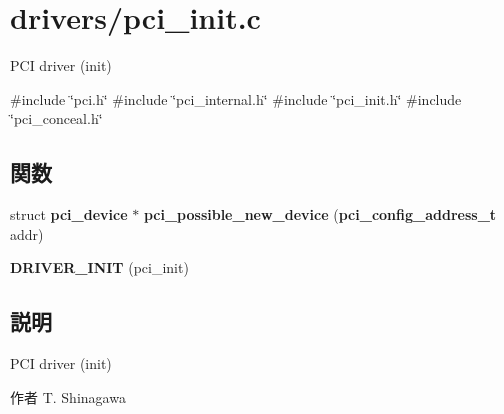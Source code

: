 \section{drivers/pci\-\_\-init.c}
\label{pci__init_8c}


\-P\-C\-I driver (init)  


{\ttfamily \#include \char`\"{}pci.\-h\char`\"{}}\*
{\ttfamily \#include \char`\"{}pci\-\_\-internal.\-h\char`\"{}}\*
{\ttfamily \#include \char`\"{}pci\-\_\-init.\-h\char`\"{}}\*
{\ttfamily \#include \char`\"{}pci\-\_\-conceal.\-h\char`\"{}}\*
\subsection*{関数}
\begin{DoxyCompactItemize}
\item 
struct {\bf pci\-\_\-device} $\ast$ {\bfseries pci\-\_\-possible\-\_\-new\-\_\-device} ({\bf pci\-\_\-config\-\_\-address\-\_\-t} addr)\label{pci__init_8c_a665e70cca9e317fdc65692f722758b89}

\item 
{\bfseries \-D\-R\-I\-V\-E\-R\-\_\-\-I\-N\-I\-T} (pci\-\_\-init)\label{pci__init_8c_adcf8aacfd26e28157747b5aeaf96169e}

\end{DoxyCompactItemize}


\subsection{説明}
\-P\-C\-I driver (init) \begin{DoxyAuthor}{作者}
\-T. \-Shinagawa 
\end{DoxyAuthor}
